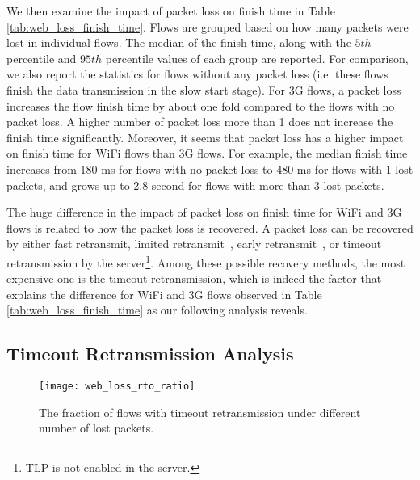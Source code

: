 We then examine the impact of packet loss on finish time in Table \ref{tab:web_loss_finish_time}. Flows are grouped based on how many packets were lost in individual flows. The median of the finish time, along with the $5th$ percentile and $95th$ percentile values of each group are reported. For comparison, we also report the statistics for flows without any packet loss (i.e. these flows finish the data transmission in the slow start stage). For 3G flows, a packet loss increases the flow finish time by about one fold compared to the flows with no packet loss. A higher number of packet loss more than 1 does not increase the finish time significantly. Moreover, it seems that packet loss has a higher impact on finish time for WiFi flows than 3G flows. For example, the median finish time increases from 180 ms for flows with no packet loss to 480 ms for flows with 1 lost packets, and grows up to 2.8 second for flows with more than 3 lost packets. 

The huge difference in the impact of packet loss on finish time for WiFi and 3G flows is related to how the packet loss is recovered. A packet loss can be recovered by either fast retransmit, limited retransmit~\cite{allman2001enhancing}, early retransmit~\cite{rfc5827}, or timeout retransmission by the server\footnote{TLP \cite{flach2013reducing} is not enabled in the server.}. Among these possible recovery methods, the most expensive one is the timeout retransmission, which is indeed the factor that explains the difference for WiFi and 3G flows observed in Table \ref{tab:web_loss_finish_time} as our following analysis reveals. 

\subsection{Timeout Retransmission Analysis}

\begin{figure}[th]
\centering
\texttt{[image: web\_loss\_rto\_ratio]}
\caption{The fraction of flows with timeout retransmission under different number of lost packets.}
\label{fig:web_loss_rto_ratio}
\end{figure}







